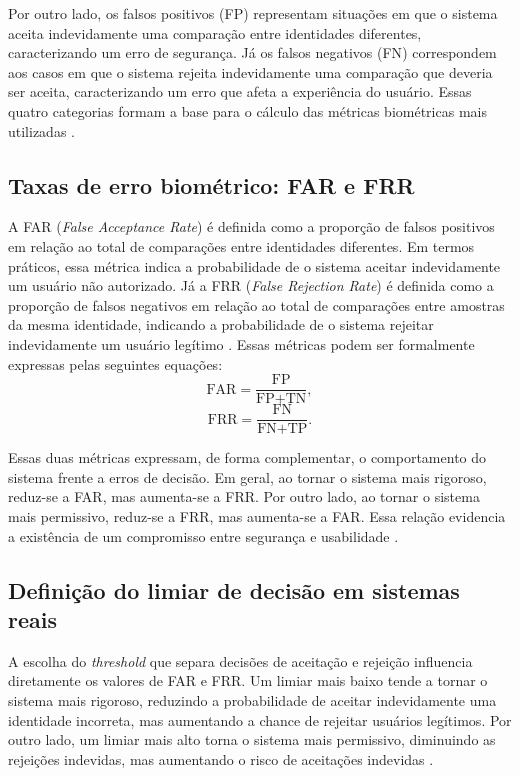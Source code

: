 Por outro lado, os falsos positivos (\acs{FP}) representam situações em que o sistema aceita indevidamente uma comparação entre identidades diferentes, caracterizando um erro de segurança. Já os falsos negativos (\acs{FN}) correspondem aos casos em que o sistema rejeita indevidamente uma comparação que deveria ser aceita, caracterizando um erro que afeta a experiência do usuário. Essas quatro categorias formam a base para o cálculo das métricas biométricas mais utilizadas \cite{jain2004biometric}.

\subsection{Taxas de erro biométrico: FAR e FRR}

A \acs{FAR} (\textit{False Acceptance Rate}) é definida como a proporção de falsos positivos em relação ao total de comparações entre identidades diferentes. Em termos práticos, essa métrica indica a probabilidade de o sistema aceitar indevidamente um usuário não autorizado. Já a \acs{FRR} (\textit{False Rejection Rate}) é definida como a proporção de falsos negativos em relação ao total de comparações entre amostras da mesma identidade, indicando a probabilidade de o sistema rejeitar indevidamente um usuário legítimo \cite{jain2004biometric}. Essas métricas podem ser formalmente expressas pelas seguintes equações:
\begin{equation}
\text{FAR} = \frac{\text{FP}}{\text{FP} + \text{TN}},
\end{equation}
\begin{equation}
\text{FRR} = \frac{\text{FN}}{\text{FN} + \text{TP}}.
\end{equation}

Essas duas métricas expressam, de forma complementar, o comportamento do sistema frente a erros de decisão. Em geral, ao tornar o sistema mais rigoroso, reduz-se a \acs{FAR}, mas aumenta-se a \acs{FRR}. Por outro lado, ao tornar o sistema mais permissivo, reduz-se a \acs{FRR}, mas aumenta-se a \acs{FAR}. Essa relação evidencia a existência de um compromisso entre segurança e usabilidade \cite{jain2004biometric}.


\subsection{Definição do limiar de decisão em sistemas reais}

A escolha do \textit{threshold} que separa decisões de aceitação e rejeição influencia diretamente os valores de \acs{FAR} e \acs{FRR}. Um limiar mais baixo tende a tornar o sistema mais rigoroso, reduzindo a probabilidade de aceitar indevidamente uma identidade incorreta, mas aumentando a chance de rejeitar usuários legítimos. Por outro lado, um limiar mais alto torna o sistema mais permissivo, diminuindo as rejeições indevidas, mas aumentando o risco de aceitações indevidas \cite{jain2004biometric}.

